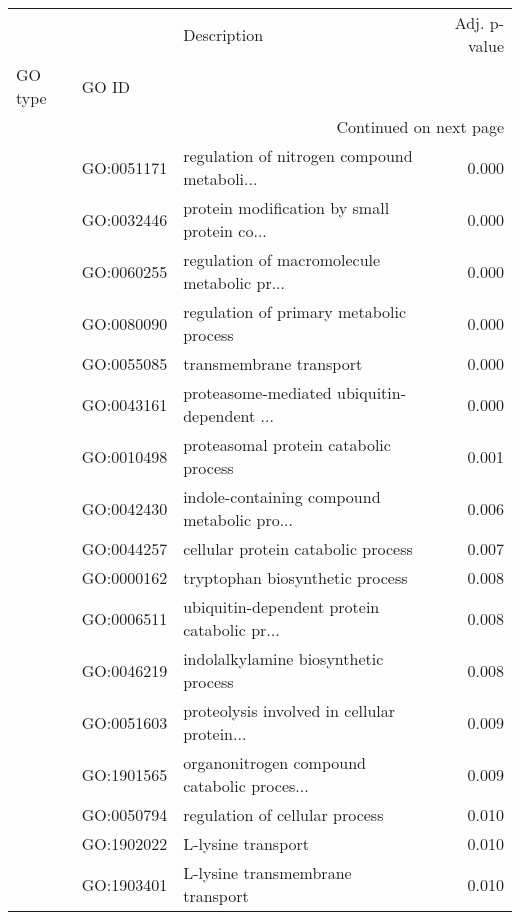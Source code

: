 \begin{longtable}{lllr}
\toprule
   &            &                                  Description &  Adj. p-value \\
GO type & GO ID &                                              &               \\
\midrule
\endhead
\midrule
\multicolumn{4}{r}{{Continued on next page}} \\
\midrule
\endfoot

\bottomrule
\endlastfoot
\multirow{43}{*}{BP} & GO:0051171 &  regulation of nitrogen compound metaboli... &         0.000 \\
   & GO:0032446 &  protein modification by small protein co... &         0.000 \\
   & GO:0060255 &  regulation of macromolecule metabolic pr... &         0.000 \\
   & GO:0080090 &      regulation of primary metabolic process &         0.000 \\
   & GO:0055085 &                      transmembrane transport &         0.000 \\
   & GO:0043161 &  proteasome-mediated ubiquitin-dependent ... &         0.000 \\
   & GO:0010498 &        proteasomal protein catabolic process &         0.001 \\
   & GO:0042430 &  indole-containing compound metabolic pro... &         0.006 \\
   & GO:0044257 &           cellular protein catabolic process &         0.007 \\
   & GO:0000162 &              tryptophan biosynthetic process &         0.008 \\
   & GO:0006511 &  ubiquitin-dependent protein catabolic pr... &         0.008 \\
   & GO:0046219 &         indolalkylamine biosynthetic process &         0.008 \\
   & GO:0051603 &  proteolysis involved in cellular protein... &         0.009 \\
   & GO:1901565 &  organonitrogen compound catabolic proces... &         0.009 \\
   & GO:0050794 &               regulation of cellular process &         0.010 \\
   & GO:1902022 &                           L-lysine transport &         0.010 \\
   & GO:1903401 &             L-lysine transmembrane transport &         0.010 \\

\end{longtable}
